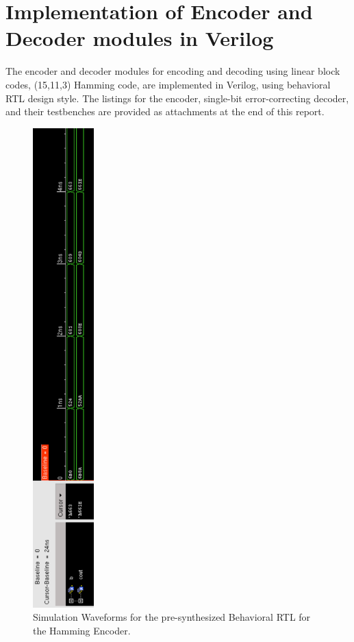 \documentclass[ee577b,acmnow]{acmtrans2m}
\begin{document}
\section{Implementation of Encoder and Decoder modules in Verilog}
The encoder and decoder modules for encoding and decoding using linear block codes, (15,11,3) Hamming code, are implemented in Verilog, using behavioral RTL design style. The listings for the encoder, single-bit error-correcting decoder, and their testbenches are provided as attachments at the end of this report.

\hspace{-2cm}\begin{figure}
\begin{center}
\includegraphics[height=18.5cm]{preenc}
\caption{Simulation Waveforms for the pre-synthesized Behavioral RTL for the Hamming Encoder.}
\label{preencoder}
\end{center}
\end{figure}
\end{document}
